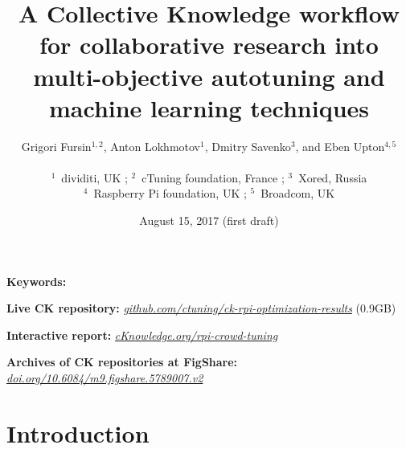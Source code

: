 \documentclass[10pt,letterpaper,twocolumn]{article}
\begin{document}
\date{August 15, 2017 (first draft)}

\title{A Collective Knowledge workflow for collaborative research into\\multi-objective autotuning and machine learning techniques}

\author{Grigori Fursin$^{1,2}$, Anton Lokhmotov$^1$, Dmitry Savenko$^3$, and Eben Upton$^{4,5}$ \\
\\
$^1$~dividiti, UK ; $^2$~cTuning foundation, France ; $^3$~Xored, Russia \\
$^4$~Raspberry Pi foundation, UK ; $^5$~Broadcom, UK\\
}

\maketitle

\begin{abstract}
 
\end{abstract}

{\bf Keywords:}
{\it\small 
 
}

{\bf Live CK repository:} \newline
\textit{\href{https://github.com/ctuning/ck-rpi-optimization-results}{github.com/ctuning/ck-rpi-optimization-results}} (0.9GB)

{\bf Interactive report:} \newline
\textit{\href{http://cKnowledge.org/rpi-crowd-tuning}{cKnowledge.org/rpi-crowd-tuning}}

{\bf Archives of CK repositories at FigShare:} \newline
\textit{\href{https://doi.org/10.6084/m9.figshare.5789007.v2}{doi.org/10.6084/m9.figshare.5789007.v2}}



\section{Introduction} %
\label{introduction} %

\end{document}
